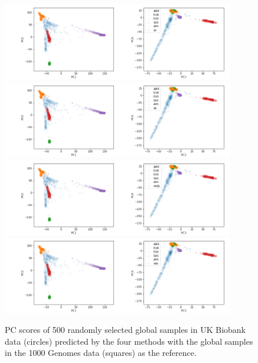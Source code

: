 \documentclass{article}
\begin{document}
\begin{figure}[p]
  \centering
  \includegraphics[width=0.90\textwidth]{img/ukb_snpscap_kgn_bial_orphans_5c_sturef_kgn_bial_orphans_snps_ukb_snpscap_ukb_sp}
  \includegraphics[width=0.90\textwidth]{img/ukb_snpscap_kgn_bial_orphans_5c_sturef_kgn_bial_orphans_snps_ukb_snpscap_ukb_ap}
  \includegraphics[width=0.90\textwidth]{img/ukb_snpscap_kgn_bial_orphans_5c_sturef_kgn_bial_orphans_snps_ukb_snpscap_ukb_oadp}
  \includegraphics[width=0.90\textwidth]{img/ukb_snpscap_kgn_bial_orphans_5c_sturef_kgn_bial_orphans_snps_ukb_snpscap_ukb_adp}
  \caption{PC scores of 500 randomly selected global samples in UK Biobank data (circles) predicted by the four methods with the global samples in the 1000 Genomes data (squares) as the reference.}
  \label{fig:ukb_500}
\end{figure}
\end{document}
